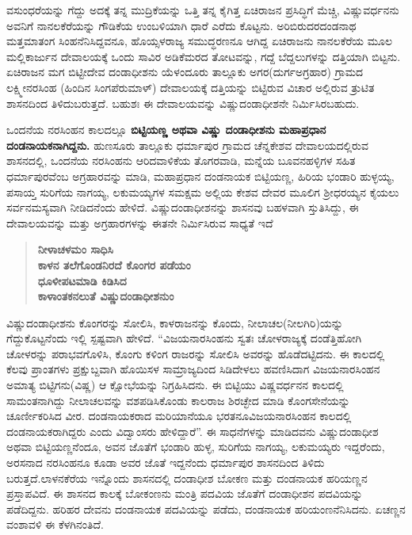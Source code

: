 ವಸುಂಧರೆಯನ್ನು ಗೆದ್ದು ಅದಕ್ಕೆ ತನ್ನ ಮುದ್ರಿಕೆಯನ್ನು ಒತ್ತಿ ತನ್ನ ಕೈಗಿತ್ತ ಏಚಿರಾಜನ ಪ್ರಸಿದ್ಧಿಗೆ ಮೆಚ್ಚಿ, ವಿಷ್ಣುವರ್ಧನನು ಅವನಿಗೆ ನಾನಲಕೆರೆಯನ್ನು ಗೌಡಿಕೆಯ ಉಂಬಳಿಯಾಗಿ ಧಾರೆ ಎರೆದು ಕೊಟ್ಟನು. ಅರಿಬಿರುದರದಂಡನಾಥ ಮತ್ತಮಾತಂಗ ಸಿಂಹನೆನಿಸಿದ್ದವನೂ, ಹೊಯ್ಸಳರಾಜ್ಯ ಸಮುದ್ಧರಣನೂ ಆಗಿದ್ದ ಏಚಿರಾಜನು ನಾನಲಕೆರೆಯ ಮೂಲ ಮಲ್ಲಿಕಾರ್ಜುನ ದೇವಾಲಯಕ್ಕೆ ಒಂದು ಸಾವಿರ ಅಡಿಕೆಮರದ ತೋಟವನ್ನು, ಗದ್ದೆ ಬೆದ್ದಲುಗಳನ್ನು ದತ್ತಿಯಾಗಿ ಬಿಟ್ಟನು. ಏಚಿರಾಜನ ಮಗ ಬಿಟ್ಟೀದೇವ ದಂಡಾಧೀಶನು ಯೆಳಂದೂರು ತಾಲ್ಲೂಕು ಅಗರ(ದುರ್ಗಅಗ್ರಹಾರ) ಗ್ರಾಮದ ಲಕ್ಷ್ಮೀನರಸಿಂಹ (ಹಿಂದಿನ ಸಿಂಗಪೆರುಮಾಳ್) ದೇವಾಲಯಕ್ಕೆ ದತ್ತಿಯನ್ನು ಬಿಟ್ಟಿರುವ ವಿಚಾರ ಅಲ್ಲಿರುವ ತ್ರುಟಿತ ಶಾಸನದಿಂದ ತಿಳಿದುಬರುತ್ತದೆ. ಬಹುಶಃ ಈ ದೇವಾಲಯವನ್ನು ವಿಷ್ಣುದಂಡಾಧೀಶನೇ ನಿರ್ಮಿಸಿರಬಹುದು.

ಒಂದನೆಯ ನರಸಿಂಹನ ಕಾಲದಲ್ಲೂ \textbf{ಬಿಟ್ಟಿಯಣ್ಣ ಅಥವಾ ವಿಷ್ಣು ದಂಡಾಧೀಶನು ಮಹಾಪ್ರಧಾನ ದಂಡನಾಯಕ\-ನಾಗಿದ್ದನು.} ಹುಣಸೂರು ತಾಲ್ಲೂಕು ಧರ್ಮಾಪುರ ಗ್ರಾಮದ ಚೆನ್ನಕೇಶವ ದೇವಾಲಯದಲ್ಲಿರುವ ಶಾಸನದಲ್ಲಿ, ಒಂದನೆಯ ನರಸಿಂಹನು ಆರಿದವಾಳಿಕೆಯ ತೊಗರವಾಡಿ, ಮನ್ನೆಯ ಬೂವನಹಳ್ಳಿಗಳ ಸಹಿತ ಧರ್ಮಾಪುರವೆಂಬ ಅಗ್ರಹಾರವನ್ನು ಮಾಡಿ, ಮಹಾಪ್ರಧಾನ ದಂಡನಾಯಕ ಬಿಟ್ಟಿಯಣ್ಣ, ಹಿರಿಯ ಭಂಡಾರಿ ಹುಳ್ಳಯ್ಯ, ಪಸಾಯ್ತ ಸುರಿಗೆಯ ನಾಗಯ್ಯ, ಲಕುಮಯ್ಯಗಳ ಸಮಕ್ಷಮ ಅಲ್ಲಿಯ ಕೇಶವ ದೇವರ ಮೂಲಿಗ ಶ‍್ರೀಧರಯ್ಯನ ಕೈಯಲು ಸರ್ವನಮಸ್ಯವಾಗಿ ನೀಡಿದನೆಂದು ಹೇಳಿದೆ. ವಿಷ್ಣುದಂಡಾಧೀಶ\-ನನ್ನು ಶಾಸನವು ಬಹಳವಾಗಿ ಸ್ತುತಿಸಿದ್ದು, ಈ ದೇವಾಲಯವನ್ನು ಮತ್ತು ಅಗ್ರಹಾರಗಳನ್ನು ಈತನೇ ನಿರ್ಮಿಸಿರುವ ಸಾಧ್ಯತೆ ಇದೆ

\begin{verse}
\textbf{ನೀಳಾಚಳಮಂ ಸಾಧಿಸಿ} \\\textbf{ಕಾಳನ ತಲೆಗೊಂಡನಿರದೆ ಕೊಂಗರ ಪಡೆಯಂ} \\\textbf{ಧೂಳೀಪಟಮಾಡಿ ಕಿಡಿಸಿದ} \\\textbf{ಕಾಳಾಂತಕನಲುತೆ ವಿಷ್ಣುದಂಡಾಧೀಶನುಂ}
\end{verse}

ವಿಷ್ಣುದಂಡಾಧೀಶನು ಕೊಂಗರನ್ನು ಸೋಲಿಸಿ, ಕಾಳರಾಜನನ್ನು ಕೊಂದು, ನೀಲಾಚಲ(ನೀಲಗಿರಿ)ಯನ್ನು ಗೆದ್ದು\-ಕೊಟ್ಟನೆಂದು ಇಲ್ಲಿ ಸ್ಪಷ್ಟವಾಗಿ ಹೇಳಿದೆ. “ವಿಜಯನಾರಸಿಂಹನು ಸ್ವತಃ ಚೋಳರಾಜ್ಯಕ್ಕೆ ದಂಡೆತ್ತಿಹೋಗಿ ಚೋಳರನ್ನು ಪರಾಭವಗೊಳಿಸಿ, ಕೊಂಗು ಕಳಿಂಗ ರಾಜರನ್ನು ಸೋಲಿಸಿ ಅವರನ್ನು ಹೊಡೆದಟ್ಟಿದನು. ಈ ಕಾಲದಲ್ಲಿ ಕೆಲವು ಪ್ರಾಂತಗಳು ಪ್ರಕ್ಷುಬ್ದವಾಗಿ ಹೊಯಿಸಳ ಸಾಮ್ರಾಜ್ಯದಿಂದ ಸಿಡಿದೇಳಲು ಹವಣಿಸಿದಾಗ ವಿಜಯನಾರಸಿಂಹನ ಅಮಾತ್ಯ ಬಿಟ್ಟಿಗನು(ವಿಷ್ಣ) ಆ ಕ್ಷೋಭೆಯನ್ನು ನಿಗ್ರಹಿಸಿದನು. ಈ ಬಿಟ್ಟಿಯು ವಿಷ್ಣವರ್ಧನನ ಕಾಲದಲ್ಲಿ ಸಾಮಂತನಾಗಿದ್ದು ನೀಲಾಚಲವನ್ನು ವಶಪಡಿಸಿಕೊಂಡು ಕಾಲರಾಜ ಶಿರಚ್ಛೇದ ಮಾಡಿ ಕೊಂಗಸೇನೆಯನ್ನು ಚೂರ್ಣೀಕರಿಸಿದ ವೀರ. ದಂಡನಾಯಕರಾದ ಮರಿಯಾನೆಯೂ ಭರತನೂ\break ವಿಜಯನಾರಸಿಂಹನ ಕಾಲದಲ್ಲಿ ದಂಡನಾಯಕರಾಗಿದ್ದರು ಎಂದು ವಿದ್ವಾಂಸರು ಹೇಳಿದ್ದಾರೆ”. ಈ ಸಾಧನೆಗಳನ್ನು ಮಾಡಿದವನು ವಿಷ್ಣುದಂಡಾಧೀಶ ಅಥವಾ ಬಿಟ್ಟಿಯಣ್ಣನೆಂದೂ, ಅವನ ಜೊತೆಗೆ ಭಂಡಾರಿ ಹುಳ್ಳ, ಸುರಿಗೆಯ ನಾಗಯ್ಯ, ಲಕುಮಯ್ಯರು ಇದ್ದರೆಂದು, ಅರಸನಾದ ನರಸಿಂಹನೂ ಕೂಡಾ ಅವರ ಜೊತೆ ಇದ್ದನೆಂದು ಧರ್ಮಾಪುರ ಶಾಸನದಿಂದ ತಿಳಿದು ಬರುತ್ತದೆ.ಲಾಳನಕೆರೆಯ ಇನ್ನೊಂದು ಶಾಸನದಲ್ಲಿ ದಂಡಾಧೀಶ ಬೋಕಣ ಮತ್ತು ದಂಡನಾಯಕ ಹರಿಯಣ್ಣನ ಪ್ರಸ್ತಾಪ\-ವಿದೆ. ಈ ಶಾಸನದ ಕಾಲಕ್ಕೆ ಬೋಕಂಣನು ಮಂತ್ರಿ ಪದವಿಯ ಜೊತೆಗೆ ದಂಡಾಧೀಶನ ಪದವಿಯನ್ನು ಪಡೆದಿದ್ದನು. ಹರಿಹರ ದೇವನು ದಂಡನಾಯಕ ಪದವಿಯನ್ನು ಪಡೆದು, ದಂಡನಾಯಕ ಹರಿಯಂಣನೆನಿಸಿದನು. ಏಚಣ್ಣನ ವಂಶಾವಳಿ ಈ ಕೆಳಗಿನಂತಿದೆ.

